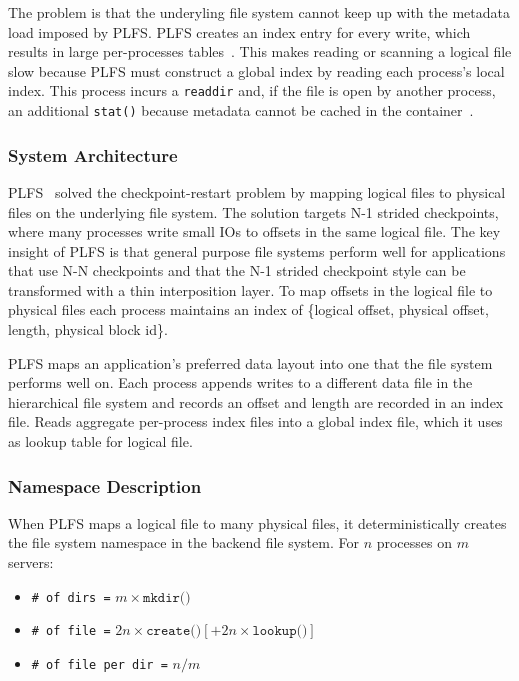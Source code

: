 The problem is that the underyling file system cannot keep up with the metadata
load imposed by PLFS. PLFS creates an index entry for every write, which
results in large per-processes tables~\cite{grider:pc17-diddlings}. This makes
reading or scanning a logical file slow because PLFS must construct a global
index by reading each process's local index. This process incurs a
\texttt{readdir} and, if the file is open by another process, an additional
\texttt{stat()} because metadata cannot be cached in the
container~\cite{bent_plfs_2009}.

\subsubsection{System Architecture}
PLFS~\cite{bent_plfs_2009} solved the checkpoint-restart problem by mapping logical
files to physical files on the underlying file system. The solution targets N-1
strided checkpoints, where many processes write small IOs to offsets in the
same logical file. The key insight of PLFS is that general purpose file systems
perform well for applications that use N-N checkpoints and that the N-1 strided
checkpoint style can be transformed with a thin interposition layer. To map
offsets in the logical file to physical files each process maintains an index
of \{logical offset, physical offset, length, physical block id\}. 

PLFS maps an application's preferred data layout into one that the file system
performs well on. Each process appends writes to a different data file in the
hierarchical file system and records an offset and length are recorded in an
index file. Reads aggregate per-process index files into a global index file,
which it uses as lookup table for logical file. 

\subsubsection{Namespace Description}

When PLFS maps a logical file to many physical files, it deterministically
creates the file system namespace in the backend file system.  For \(n\)
processes on \(m\) servers:

\begin{itemize}
  \item[] \texttt{\# of dirs =} \(m \times \texttt{mkdir()}\)
  \item[] \texttt{\# of file =} \(2n \times \texttt{create()} [+ 2n \times \texttt{lookup()}]\)
  \item[] \texttt{\# of file per dir =} \(n/m\)
\end{itemize}

